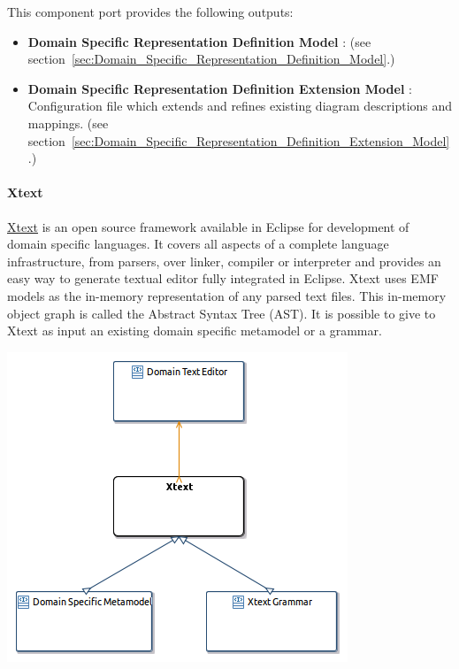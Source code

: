 \documentclass{gemoc} %
\begin{document}
This component port provides the following outputs:
\begin{itemize}
  \item \textbf{Domain Specific Representation Definition Model} :
(see section~\ref{sec:Domain_Specific_Representation_Definition_Model}.)
  \item \textbf{Domain Specific Representation Definition Extension Model} :
Configuration file which extends and refines existing diagram descriptions and mappings.
(see section~\ref{sec:Domain_Specific_Representation_Definition_Extension_Model}.)
\end{itemize}


\paragraph{Xtext}
\label{sec:Xtext}

\href{http://www.eclipse.org/Xtext}{Xtext} is an open source framework available in Eclipse for development of domain specific languages.
It covers all aspects of a complete language infrastructure, from parsers, over linker, compiler or interpreter and provides an easy way to generate textual editor fully integrated in Eclipse.
Xtext uses EMF models as the in-memory representation of any parsed text files. This in-memory object graph is called the Abstract Syntax Tree (AST).
It is possible to give to Xtext as input an existing domain specific metamodel or a grammar.
\begin{center}
\includegraphics*[trim=0.0cm 0.0cm 0cm 0.0cm, clip=true]{../images/generated/Generated_Xtext.png}
\end{center}
\end{document}
